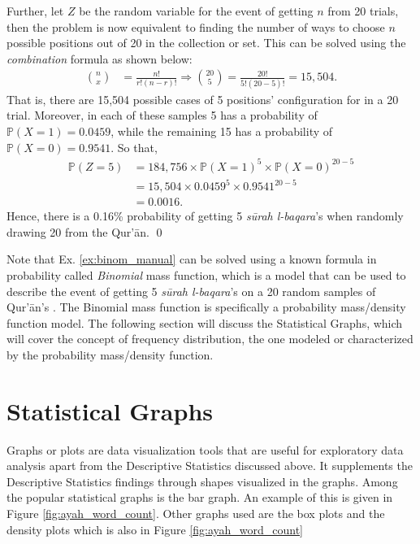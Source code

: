 \begin{exmpx}
Further, let $Z$ be the random variable for the event of getting $n$  from 20 trials, then the problem is now equivalent to finding the number of ways to choose $n$ possible positions out of 20 in the collection or set. This can be solved using the \textit{combination} formula as shown below:
\begin{align}
    n \choose x &= \frac{n!}{r!(n-r)!}\Rightarrow{20 \choose 5} = \frac{20!}{5!(20-5)!}=15,504. 
\end{align}
That is, there are 15,504 possible cases of 5 positions' configuration for  in a 20 trial. Moreover, in each of these samples 5 has a probability of $\mathbb{P}(X=1)=0.0459$, while the remaining 15 has a probability of $\mathbb{P}(X=0)=0.9541$. So that,
\begin{align}
    \mathbb{P}(Z=5)&=184,756\times\mathbb{P}(X=1)^{5}\times\mathbb{P}(X=0)^{20-5}\nonumber\\
    &=15,504\times0.0459^{5}\times0.9541^{20-5}\nonumber\\
    &=0.0016.
\end{align}
Hence, there is a 0.16\% probability of getting 5 \textit{s\=urah l-baqara}'s   when randomly drawing 20  from the Qur'\=an.
\qed
\end{exmpx}
Note that Ex. \ref{ex:binom_manual} can be solved using a known formula in probability called \textit{Binomial} mass function, which is a model that can be used to describe the event of getting 5 \textit{s\=urah l-baqara}'s   on a 20 random samples of Qur'\=an's . The {Binomial} mass function is specifically a probability mass/density function model. The following section will discuss the Statistical Graphs, which will cover the concept of frequency distribution, the one modeled or characterized by the probability mass/density function.
\section{Statistical Graphs}\label{sec:stat_graphs_method}
Graphs or plots are data visualization tools that are useful for exploratory data analysis apart from the Descriptive Statistics discussed above. It supplements the Descriptive Statistics findings through shapes visualized in the graphs. Among the popular statistical graphs is the bar graph. An example of this is given in Figure \ref{fig:ayah_word_count}. Other graphs used are the box plots and the density plots which is also in Figure \ref{fig:ayah_word_count}
